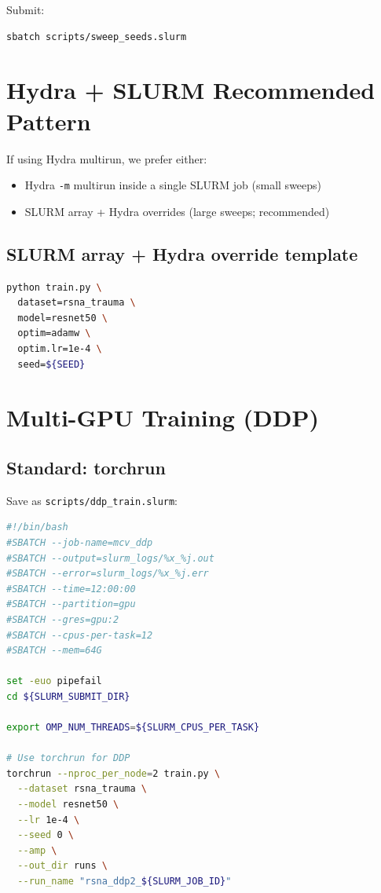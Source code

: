 \documentclass[11pt]{article}
\begin{document}
Submit:
\begin{lstlisting}
sbatch scripts/sweep_seeds.slurm
\end{lstlisting}

\section{Hydra + SLURM Recommended Pattern}
If using Hydra multirun, we prefer either:
\begin{itemize}[nosep]
    \item Hydra \texttt{-m} multirun inside a single SLURM job (small sweeps)
    \item SLURM array + Hydra overrides (large sweeps; recommended)
\end{itemize}

\subsection{SLURM array + Hydra override template}
\begin{lstlisting}[language=bash]
python train.py \
  dataset=rsna_trauma \
  model=resnet50 \
  optim=adamw \
  optim.lr=1e-4 \
  seed=${SEED}
\end{lstlisting}

\section{Multi-GPU Training (DDP)}
\subsection{Standard: torchrun}
Save as \texttt{scripts/ddp\_train.slurm}:

\begin{lstlisting}[language=bash]
#!/bin/bash
#SBATCH --job-name=mcv_ddp
#SBATCH --output=slurm_logs/%x_%j.out
#SBATCH --error=slurm_logs/%x_%j.err
#SBATCH --time=12:00:00
#SBATCH --partition=gpu
#SBATCH --gres=gpu:2
#SBATCH --cpus-per-task=12
#SBATCH --mem=64G

set -euo pipefail
cd ${SLURM_SUBMIT_DIR}

export OMP_NUM_THREADS=${SLURM_CPUS_PER_TASK}

# Use torchrun for DDP
torchrun --nproc_per_node=2 train.py \
  --dataset rsna_trauma \
  --model resnet50 \
  --lr 1e-4 \
  --seed 0 \
  --amp \
  --out_dir runs \
  --run_name "rsna_ddp2_${SLURM_JOB_ID}"
\end{lstlisting}
\end{document}
